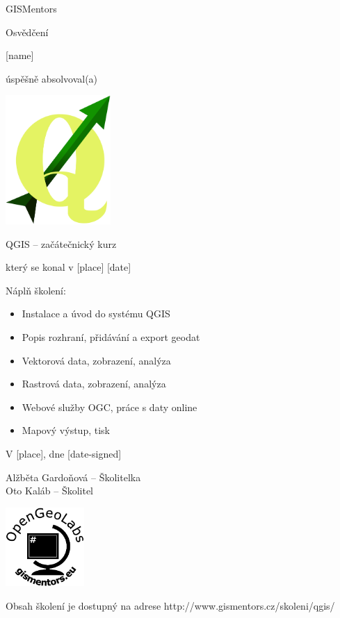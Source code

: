 \documentclass[12pt, a4paper]{letter}
\begin{document}
\pagestyle{empty}
\begin{center}

{\Large GISMentors}

{\Huge Osvědčení}

{\Large [name]}

úspěšně absolvoval(a)

\includegraphics[width=0.30\textwidth]{../images/qgislogo_vector.eps}

{\Large QGIS -- začátečnický kurz}

který se konal v [place] [date]
\end{center}

Náplň školení:

\begin{itemize}
    \item Instalace a úvod do systému QGIS
    \item Popis rozhraní, přidávání a export geodat
    \item Vektorová data, zobrazení, analýza
    \item Rastrová data, zobrazení, analýza
    \item Webové služby OGC, práce s daty online
    \item Mapový výstup, tisk
\end{itemize}

\vfill
\parbox{7cm}{

    V [place], dne [date-signed]\\

\vfill

    Alžběta Gardoňová -- Školitelka\\

\vfill
    Oto Kaláb -- Školitel
}
\hfill
\parbox{3cm}{
    \includegraphics[width=3cm]{../images/placka.eps}
}


\begin{center}
{\footnotesize Obsah školení je dostupný na adrese
http://www.gismentors.cz/skoleni/qgis/}
\end{center}
\end{document}
